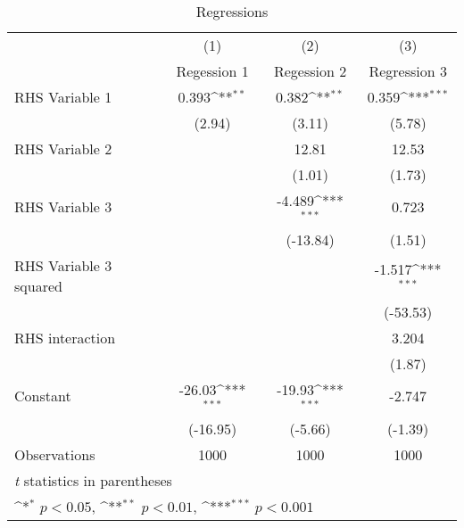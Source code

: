 \documentclass[DIV=calc, paper=a4, fontsize=11pt, article]{scrartcl}	 %
\begin{document}
\begin{table}[htbp]\centering
\def\sym#1{\ifmmode^{#1}\else\(^{#1}\)\fi}
\caption{Regressions\label{regtable}}
\begin{tabular}{l*{3}{c}}
\hline\hline
                    &\multicolumn{1}{c}{(1)}&\multicolumn{1}{c}{(2)}&\multicolumn{1}{c}{(3)}\\
                    &\multicolumn{1}{c}{Regession 1}&\multicolumn{1}{c}{Regession 2}&\multicolumn{1}{c}{Regression 3}\\
\hline
RHS Variable 1      &       0.393\sym{**} &       0.382\sym{**} &       0.359\sym{***}\\
                    &      (2.94)         &      (3.11)         &      (5.78)         \\
[1em]
RHS Variable 2      &                     &       12.81         &       12.53         \\
                    &                     &      (1.01)         &      (1.73)         \\
[1em]
RHS Variable 3      &                     &      -4.489\sym{***}&       0.723         \\
                    &                     &    (-13.84)         &      (1.51)         \\
[1em]
RHS Variable 3 squared&                     &                     &      -1.517\sym{***}\\
                    &                     &                     &    (-53.53)         \\
[1em]
RHS interaction     &                     &                     &       3.204         \\
                    &                     &                     &      (1.87)         \\
[1em]
Constant            &      -26.03\sym{***}&      -19.93\sym{***}&      -2.747         \\
                    &    (-16.95)         &     (-5.66)         &     (-1.39)         \\
\hline
Observations        &        1000         &        1000         &        1000         \\
\hline\hline
\multicolumn{4}{l}{\footnotesize \textit{t} statistics in parentheses}\\
\multicolumn{4}{l}{\footnotesize \sym{*} \(p<0.05\), \sym{**} \(p<0.01\), \sym{***} \(p<0.001\)}\\
\end{tabular}
\end{table}
\end{document}
